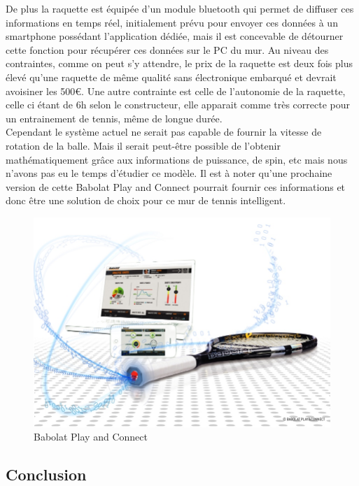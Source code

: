 De plus la raquette est équipée d'un module bluetooth qui permet de diffuser ces informations en temps réel, initialement prévu pour envoyer ces données à un smartphone possédant l'application dédiée, mais il est concevable de détourner cette fonction pour récupérer ces données sur le PC du mur. Au niveau des contraintes, comme on peut s'y attendre, le prix de la raquette est deux fois plus élevé qu'une raquette de même qualité sans électronique embarqué et devrait avoisiner les 500€. Une autre contrainte est celle de l'autonomie de la raquette, celle ci étant de 6h selon le constructeur, elle apparait comme très correcte pour un entrainement de tennis, même de longue durée.\\

Cependant le système actuel ne serait pas capable de fournir la vitesse de rotation de la balle. Mais il serait peut-être possible de l'obtenir mathématiquement grâce aux informations de puissance, de spin, etc mais nous n'avons pas eu le temps d'étudier ce modèle. Il est à noter qu'une prochaine version de cette Babolat Play and Connect pourrait fournir ces informations et donc être une solution de choix pour ce mur de tennis intelligent.

\begin{figure}[h]
\begin{center}
\includegraphics[width=\textwidth]{babolatplayandconnect.jpg}
\caption{Babolat Play and Connect}
\label{img_babolatplayandconnect}
\end{center}
\end{figure}




\subsection{Conclusion}

